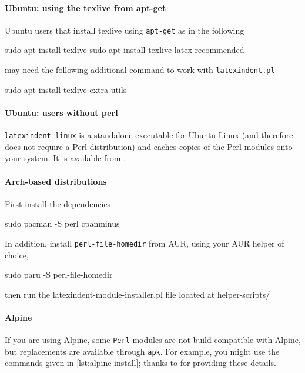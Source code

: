   \paragraph{Ubuntu: using the texlive from apt-get}
   Ubuntu users that install texlive using \texttt{apt-get} as in the following

   \begin{commandshell}
sudo apt install texlive
sudo apt install texlive-latex-recommended
\end{commandshell}

   may need the following additional command to work with \texttt{latexindent.pl}

   \begin{commandshell}
sudo apt install texlive-extra-utils
\end{commandshell}

  \paragraph{Ubuntu: users without perl}

   \texttt{latexindent-linux} is a standalone executable  for Ubuntu Linux (and therefore does not require a Perl distribution)
   and caches copies of the Perl modules onto your system. It is available from \cite{latexindent-home}.
     

  \paragraph{Arch-based distributions}
   First install the dependencies

   \begin{commandshell}
sudo pacman -S perl cpanminus
\end{commandshell}

   In addition, install \texttt{perl-file-homedir} from AUR, using your AUR helper of
   choice,

   \begin{commandshell}
sudo paru -S perl-file-homedir
\end{commandshell}

   then run the latexindent-module-installer.pl file located at helper-scripts/

  \paragraph{Alpine}
   If you are using Alpine, some \texttt{Perl} modules are not build-compatible with
   Alpine, but replacements are available through \texttt{apk}. For example, you might
   use the commands given in \cref{lst:alpine-install}; thanks to \cite{jun-sheaf} for
   providing these details.

